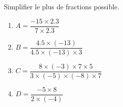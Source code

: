 \begin{exercice*}
    Simplifier le plus de fractions possible.
    \begin{multicols}{2}
        \begin{spacing}{2}
            \begin{enumerate}
                \item $A=\dfrac{-15\times\num{2.3}}{7\times\num{2.3}}$
                \item $B=\dfrac{\num{4.5}\times (-13)}{\num{4.5}\times (-13)\times 3}$
                \item $C=\dfrac{8\times (-3)\times 7\times 5}{3\times (-5)\times (-8)\times 7}$
                \item $D=\dfrac{-5\times 8}{2\times (-4)}$
            \end{enumerate}
        \end{spacing}        
    \end{multicols}
\end{exercice*}
